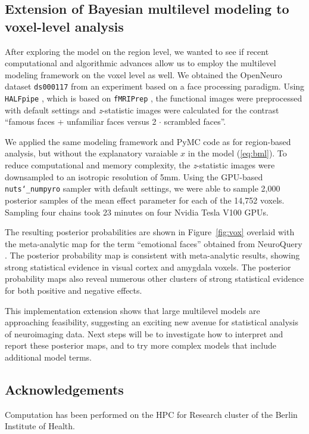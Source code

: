 \documentclass[../main.tex]{subfiles}
\begin{document}
\subsection{Extension of Bayesian multilevel modeling to voxel-level analysis}

After exploring the model on the region level, we wanted to see if recent computational and algorithmic advances allow us to employ the multilevel modeling framework on the voxel level as well. We obtained the OpenNeuro dataset \texttt{ds000117} \parencite{wakeman_multi-subject_2015} from an experiment based on  a face processing paradigm. Using \texttt{HALFpipe} \parencite{waller_enigma_2022}, which is based on \texttt{fMRIPrep} \parencite{esteban_fmriprep_2019}, the functional images were preprocessed with default settings and \emph{z}-statistic images were calculated for the contrast ``famous faces + unfamiliar faces versus 2 $\cdot$ scrambled faces''. 

We applied the same modeling framework and PyMC code as for region-based analysis, but without the explanatory varaiable $x$ in the model (\ref{eq:bml}). To reduce computational and memory complexity, the \emph{z}-statistic images were downsampled to an isotropic resolution of 5mm. Using the GPU-based \texttt{nuts\char`_numpyro} sampler \parencite{phan_composable_2019} with default settings, we were able to sample 2,000 posterior samples of the mean effect parameter for each of the 14,752 voxels. Sampling four chains took 23 minutes on four Nvidia Tesla V100 GPUs.

The resulting posterior probabilities are shown in Figure~\ref{fig:vox} overlaid with the meta-analytic map for the term ``emotional faces'' obtained from NeuroQuery \parencite{dockes_neuroquery_2020}. The posterior probability map is consistent with meta-analytic results, showing strong statistical evidence in visual cortex and amygdala voxels. The posterior probability maps also reveal numerous other clusters of strong statistical evidence for both positive and negative effects. 

This implementation extension shows that large multilevel models are approaching feasibility, suggesting an exciting new avenue for statistical analysis of neuroimaging data. Next steps will be to investigate how to interpret and report these posterior maps, and to try more complex models that include additional model terms.

\subsection*{Acknowledgements}

Computation has been performed on the HPC for Research cluster of the Berlin Institute of Health.

\printbibliography
\end{document}

